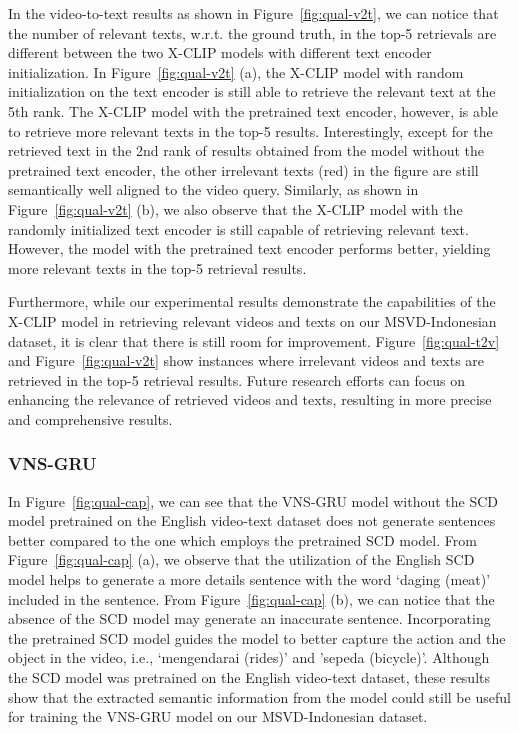 \documentclass{article}
\begin{document}
In the video-to-text results as shown in Figure~\ref{fig:qual-v2t}, we can notice that the number of relevant texts, w.r.t. the ground truth, in the top-5 retrievals are different between the two X-CLIP models with different text encoder initialization. In Figure~\ref{fig:qual-v2t} (a), the X-CLIP model with random initialization on the text encoder is still able to retrieve the relevant text at the 5th rank. The X-CLIP model with the pretrained text encoder, however, is able to retrieve more relevant texts in the top-5 results. Interestingly, except for the retrieved text in the 2nd rank of results obtained from the model without the pretrained text encoder, the other irrelevant texts (red) in the figure are still semantically well aligned to the video query. Similarly, as shown in Figure~\ref{fig:qual-v2t} (b), we also observe that the X-CLIP model with the randomly initialized text encoder is still capable of retrieving relevant text. However, the model with the pretrained text encoder performs better, yielding more relevant texts in the top-5 retrieval results.

Furthermore, while our experimental results demonstrate the capabilities of the X-CLIP model in retrieving relevant videos and texts on our MSVD-Indonesian dataset, it is clear that there is still room for improvement. Figure~\ref{fig:qual-t2v} and Figure~\ref{fig:qual-v2t} show instances where irrelevant videos and texts are retrieved in the top-5 retrieval results. Future research efforts can focus on enhancing the relevance of retrieved videos and texts, resulting in more precise and comprehensive results. 



\subsubsection{VNS-GRU}
In Figure~\ref{fig:qual-cap}, we can see that the VNS-GRU model without the SCD model pretrained on the English video-text dataset does not generate sentences better compared to the one which employs the pretrained SCD model. From Figure~\ref{fig:qual-cap} (a), we observe that the utilization of the English SCD model helps to generate a more details sentence with the word `daging (meat)' included in the sentence. From Figure~\ref{fig:qual-cap} (b), we can notice that the absence of the SCD model may generate an inaccurate sentence. Incorporating the pretrained SCD model guides the model to better capture the action and the object in the video, i.e., `mengendarai (rides)' and 'sepeda (bicycle)'. Although the SCD model was pretrained on the English video-text dataset, these results show that the extracted semantic information from the model could still be useful for training the VNS-GRU model on our MSVD-Indonesian dataset. 
\end{document}
